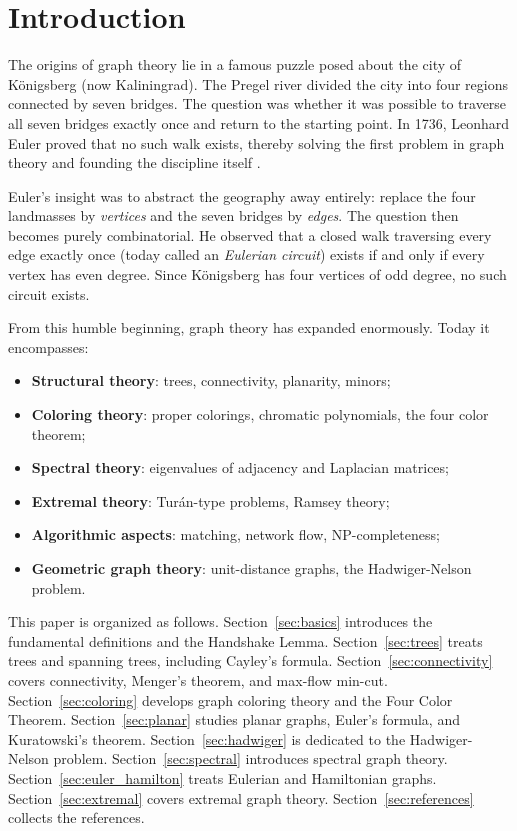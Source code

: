 \documentclass[12pt,a4paper]{amsart}
\theoremstyle{definition}
\theoremstyle{remark}
\begin{document}
\tableofcontents

\section{Introduction}

The origins of graph theory lie in a famous puzzle posed about the city of
K\"{o}nigsberg (now Kaliningrad). The Pregel river divided the city into four
regions connected by seven bridges. The question was whether it was possible
to traverse all seven bridges exactly once and return to the starting point.
In 1736, Leonhard Euler proved that no such walk exists, thereby solving the
first problem in graph theory and founding the discipline itself
\cite{euler1736}.

Euler's insight was to abstract the geography away entirely: replace the four
landmasses by \emph{vertices} and the seven bridges by \emph{edges}. The
question then becomes purely combinatorial. He observed that a closed walk
traversing every edge exactly once (today called an \emph{Eulerian circuit})
exists if and only if every vertex has even degree. Since K\"{o}nigsberg
has four vertices of odd degree, no such circuit exists.

From this humble beginning, graph theory has expanded enormously. Today it
encompasses:
\begin{itemize}[leftmargin=2em]
  \item \textbf{Structural theory}: trees, connectivity, planarity, minors;
  \item \textbf{Coloring theory}: proper colorings, chromatic polynomials,
        the four color theorem;
  \item \textbf{Spectral theory}: eigenvalues of adjacency and Laplacian matrices;
  \item \textbf{Extremal theory}: Tur\'{a}n-type problems, Ramsey theory;
  \item \textbf{Algorithmic aspects}: matching, network flow, NP-completeness;
  \item \textbf{Geometric graph theory}: unit-distance graphs, the
        Hadwiger-Nelson problem.
\end{itemize}

This paper is organized as follows. Section~\ref{sec:basics} introduces the
fundamental definitions and the Handshake Lemma. Section~\ref{sec:trees}
treats trees and spanning trees, including Cayley's formula. Section~\ref{sec:connectivity}
covers connectivity, Menger's theorem, and max-flow min-cut. Section~\ref{sec:coloring}
develops graph coloring theory and the Four Color Theorem. Section~\ref{sec:planar}
studies planar graphs, Euler's formula, and Kuratowski's theorem.
Section~\ref{sec:hadwiger} is dedicated to the Hadwiger-Nelson problem.
Section~\ref{sec:spectral} introduces spectral graph theory. Section~\ref{sec:euler_hamilton}
treats Eulerian and Hamiltonian graphs. Section~\ref{sec:extremal} covers
extremal graph theory. Section~\ref{sec:references} collects the references.
\end{document}
